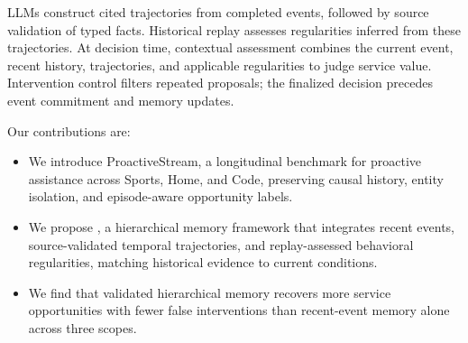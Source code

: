 LLMs construct cited trajectories from completed events, followed by source validation of typed facts.
Historical replay assesses regularities inferred from these trajectories.
At decision time, contextual assessment combines the current event, recent history, trajectories, and applicable regularities to judge service value.
Intervention control filters repeated proposals; the finalized decision precedes event commitment and memory updates.

Our contributions are:
\begin{itemize}[leftmargin=*, itemsep=0pt]
    \item We introduce ProactiveStream, a longitudinal benchmark for proactive assistance across Sports, Home, and Code, preserving causal history, entity isolation, and episode-aware opportunity labels.
    \item We propose \system{}, a hierarchical memory framework that integrates recent events, source-validated temporal trajectories, and replay-assessed behavioral regularities, matching historical evidence to current conditions.
    \item We find that validated hierarchical memory recovers more service opportunities with fewer false interventions than recent-event memory alone across three scopes.
\end{itemize}
